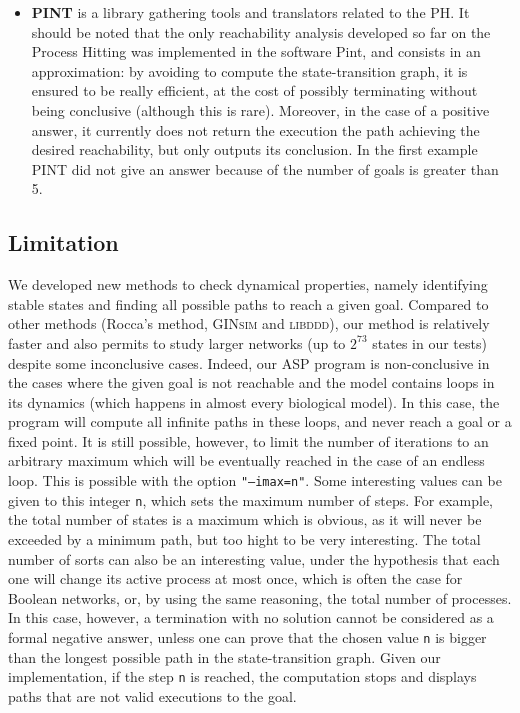 \begin{itemize}
\item \textbf{PINT}
is a library gathering tools and translators related to the PH.
It should be noted that the only reachability analysis developed so far on the Process Hitting
was implemented in the software Pint, and consists in an approximation:
by avoiding to compute the state-transition graph, it is ensured to be really efficient,
at the cost of possibly terminating without being conclusive (although this is rare).
Moreover, in the case of a positive answer,
it currently does not return the execution the path achieving the desired reachability,
but only outputs its conclusion.
In the first example \textsc{PINT} did not give an answer because of the number of goals is greater than 5.
\end{itemize}

\subsection{Limitation}

We developed new methods to check dynamical properties,
namely identifying stable states and finding all possible paths to reach a given goal.
Compared to other methods (Rocca's method, \textsc{GINsim} and \textsc{libddd}),
our method is relatively faster and also permits to study larger networks
(up to $2^{73}$ states in our tests) despite some inconclusive cases.
Indeed, our ASP program is non-conclusive in the cases where the given goal is not
reachable and the model contains loops in its dynamics
(which happens in almost every biological model).
In this case, the program will compute all infinite paths in these loops,
and never reach a goal or a fixed point.
It is still possible, however, to limit the number of iterations to an arbitrary
maximum which will be eventually reached in the case of an endless loop. This is possible with the option \texttt{"--imax=n"}.
Some interesting values can be given to this integer \texttt{n},
which sets the maximum number of steps.
For example, the total number of states is a maximum which is obvious,
as it will never be exceeded by a minimum path,
but too hight to be very interesting.
The total number of sorts can also be an interesting value,
under the hypothesis that each one will change its active process at most once,
which is often the case for Boolean networks,
or, by using the same reasoning, the total number of processes.
In this case, however, a termination with no solution cannot be considered as a formal
negative answer, unless one can prove that the chosen value \texttt{n}
is bigger than the longest possible path in the state-transition graph.
Given our implementation, if the step \texttt{n} is reached,
the computation stops and displays paths that are not valid executions
to the goal.

